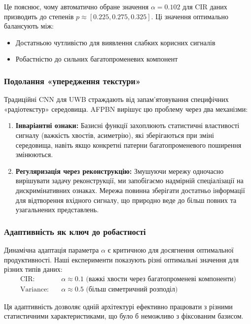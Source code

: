 \documentclass[12pt,a4paper]{article}
\begin{document}
Це пояснює, чому автоматично обране значення $\alpha = 0.102$ для CIR даних призводить до степенів $p \approx [0.225, 0.275, 0.325]$. Ці значення оптимально балансують між:
\begin{itemize}
	\item Достатньою чутливістю для виявлення слабких корисних сигналів
	\item Робастністю до сильних багатопроменевих компонент
\end{itemize}

\subsubsection{Подолання «упередження текстури»}

Традиційні CNN для UWB страждають від запам'ятовування специфічних «радіотекстур» середовища. AFPBN вирішує цю проблему через два механізми:

\begin{enumerate}
	\item \textbf{Інваріантні ознаки:} Базисні функції захоплюють статистичні властивості сигналу (важкість хвостів, асиметрію), які зберігаються при зміні середовища, навіть якщо конкретні патерни багатопроменевого поширення змінюються.
	
	\item \textbf{Регуляризація через реконструкцію:} Змушуючи мережу одночасно вирішувати задачу реконструкції, ми запобігаємо надмірній спеціалізації на дискримінативних ознаках. Мережа повинна зберігати достатньо інформації для відтворення вхідного сигналу, що природно веде до більш повних та узагальнених представлень.
\end{enumerate}

\subsubsection{Адаптивність як ключ до робастності}

Динамічна адаптація параметра $\alpha$ є критичною для досягнення оптимальної продуктивності. Наші експерименти показують різні оптимальні значення для різних типів даних:
\begin{align}
	\text{CIR:} \quad &\alpha \approx 0.1 \text{ (важкі хвости через багатопроменеві компоненти)} \\
	\text{Variance:} \quad &\alpha \approx 0.5 \text{ (більш симетричний розподіл)}
\end{align}

Ця адаптивність дозволяє одній архітектурі ефективно працювати з різними статистичними характеристиками, що було б неможливо з фіксованим базисом.
\end{document}
